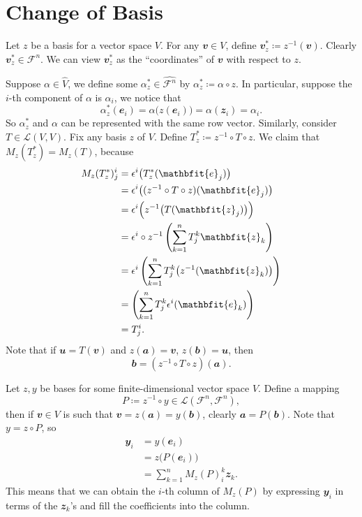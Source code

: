 \documentclass[math, code]{amznotes}
\theoremstyle{remark}
\begin{document}
\section{Change of Basis}\label{sectionChangeBasis}
Let $z$ be a basis for a vector space $V$. For any $\mathbfit{v} \in V$, define $\mathbfit{v}^*_z \coloneqq z^{-1}(\mathbfit{v})$. Clearly $\mathbfit{v}^*_z \in \mathcal{F}^n$. We can view $\mathbfit{v}^*_z$ as the ``coordinates'' of $\mathbfit{v}$ with respect to $z$.

Suppose $\alpha \in \hat{V}$, we define some $\alpha^*_z \in \hat{\mathcal{F}^n}$ by $\alpha^*_z \coloneqq \alpha \circ z$. In particular, suppose the $i$-th component of $\alpha$ is $\alpha_i$, we notice that
\begin{equation*}
    \alpha^*_z(\mathbfit{e}_i) = \alpha\bigl(z(\mathbfit{e}_i)\bigr) = \alpha(\mathbfit{z}_i) = \alpha_i.
\end{equation*}
So $\alpha^*_z$ and $\alpha$ can be represented with the same row vector. Similarly, consider $T \in \mathcal{L}(V, V)$. Fix any basis $z$ of $V$. Define $T^*_z \coloneqq z^{-1} \circ T \circ z$. We claim that $M_z(T^*_z) = M_z(T)$, because
\begin{align*}
    M_z(T^*_z)^i_j & = \epsilon^i\bigl(T^*_z(\mathbfit{e}_j)\bigr) \\
    & = \epsilon^i\bigl((z^{-1} \circ T \circ z)(\mathbfit{e}_j)\bigr) \\
    & = \epsilon^i\Bigl(z^{-1}\bigl(T(\mathbfit{z}_j)\bigr)\Bigr) \\
    & = \epsilon^i \circ z^{-1}\left(\sum_{k = 1}^{n}T^k_j\mathbfit{z}_k\right) \\
    & = \epsilon^i\left(\sum_{k = 1}^{n}T^k_j\bigl(z^{-1}(\mathbfit{z}_k)\bigr)\right) \\
    & = \left(\sum_{k = 1}^{n}T^k_j\epsilon^i(\mathbfit{e}_k)\right) \\
    & = T^i_j.
\end{align*}
Note that if $\mathbfit{u} = T(\mathbfit{v})$ and $z(\mathbfit{a}) = \mathbfit{v}$, $z(\mathbfit{b}) = \mathbfit{u}$, then 
\begin{equation*}
    \mathbfit{b} = \left(z^{-1} \circ T \circ z\right)(\mathbfit{a}).
\end{equation*}

Let $z, y$ be bases for some finite-dimensional vector space $V$. Define a mapping
\begin{equation*}
    P \coloneqq z^{-1} \circ y \in \mathcal{L}\left(\mathcal{F}^n, \mathcal{F}^n\right),
\end{equation*}
then if $\mathbfit{v} \in V$ is such that $\mathbfit{v} = z(\mathbfit{a}) = y(\mathbfit{b})$, clearly $\mathbfit{a} = P(\mathbfit{b})$. Note that $y = z \circ P$, so
\begin{align*}
    \mathbfit{y}_i & = y(\mathbfit{e}_i) \\
    & = z\bigl(P(\mathbfit{e}_i)\bigr) \\
    & = \sum_{k = 1}^{n}M_z(P)^k_i\mathbfit{z}_k.
\end{align*} 
This means that we can obtain the $i$-th column of $M_z(P)$ by expressing $\mathbfit{y}_i$ in terms of the $\mathbfit{z}_k$'s and fill the coefficients into the column.
\end{document}
